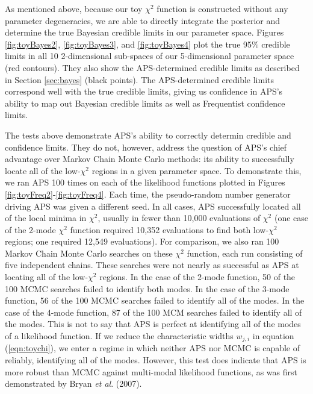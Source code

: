 \documentclass[useAMS,usenatbib]{aastex}
\begin{document}
As mentioned above, because our toy $\chi^2$ function is constructed without any
parameter degeneracies, we are able to directly integrate the posterior and
determine the true Bayesian credible limits in our parameter space.  Figures
\ref{fig:toyBayes2}, \ref{fig:toyBayes3}, and \ref{fig:toyBayes4} plot the true
95\% credible limits in all 10 2-dimensional sub-spaces of our 5-dimensional
parameter space (red contours).  They also show the APS-determined credible
limits as described in Section \ref{sec:bayes} (black points).  The
APS-determined credible limits correspond well with the true credible limits,
giving us confidence in APS's ability to map out Bayesian credible limits as well
as Frequentist confidence limits.

The tests above demonstrate APS's ability to correctly determin credible and
confidence limits.  They do not, however, address the question of APS's chief
advantage over Markov Chain Monte Carlo methods: its ability to successfully
locate all of the low-$\chi^2$ regions in a given parameter space.  To
demonstrate this, we ran APS 100 times on each of the likelihood functions
plotted in Figures \ref{fig:toyFreq2}-\ref{fig:toyFreq4}.  Each time, the
pseudo-random number generator driving APS was given a different seed.  In all
cases, APS successfully located all of the local minima in $\chi^2$, usually in
fewer than 10,000 evaluations of $\chi^2$ (one case of the 2-mode $\chi^2$
function required 10,352 evaluations to find both low-$\chi^2$ regions; one
required 12,549 evaluations).  For comparison, we also ran 100 Markov Chain
Monte Carlo searches on these $\chi^2$ function, each run consisting of five
independent chains.  These searches were not nearly as successful as APS at
locating all of the low-$\chi^2$ regions.  In the case of the 2-mode function,
50 of the 100 MCMC searches failed to identify both modes.  In the case of the
3-mode function, 56 of the 100 MCMC searches failed to identify all of the
modes.  In the case of the 4-mode function, 87 of the 100 MCM searches failed to
identify all of the modes.  This is not to say that APS is perfect at
identifying all of the modes of a likelihood function.  If we reduce the
characteristic widths $w_{j,i}$ in equation (\ref{eqn:toychi}), we enter a regime
in which neither APS nor MCMC is capable of reliably,
identifying all of the modes.  However, this test does indicate that APS is more
robust than MCMC against multi-modal likelihood functions, as was first
demonstrated by Bryan {\it et al}. (2007).
\end{document}
